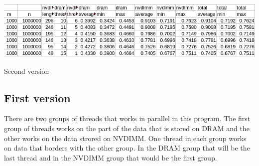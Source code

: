 \documentclass[12pt,a4paper,USenglish]{article}      %
\begin{document}
\begin{table}[!hbtp]
\includegraphics[scale=0.7]{Formula_Second_version.png}
\caption{Second version}
\end{table}

\subsection{First version}
There are two groups of threads that works in parallel in this program. The first group of threads works on the part of the data that is stored on DRAM and the other works on the data strored on NVDIMM. One thread in each group works on data that borders with the other group. In the DRAM group that will be the last thread and in the NVDIMM group that would be the first group. 
\end{document}
